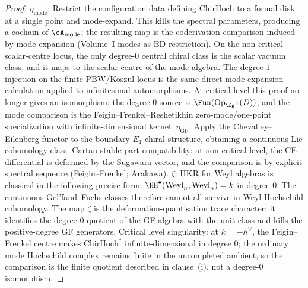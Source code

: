 \begin{proof}
$\eta_{\mathrm{mode}}$: Restrict the configuration data defining
$\mathrm{ChirHoch}$ to a formal disk at a single point and
mode-expand. This kills the spectral parameters, producing a cochain
of $\cA_{\mathrm{mode}}$; the resulting map is the coderivation
comparison induced by mode expansion (Volume~I modes-as-BD
restriction).  On the non-critical scalar-centre locus, the only
degree-$0$ central chiral class is the scalar vacuum class, and it maps
to the scalar centre of the mode algebra.  The degree-$1$ injection on
the finite PBW/Koszul locus is the same direct mode-expansion
calculation applied to infinitesimal automorphisms.  At critical level
this proof no longer gives an isomorphism: the degree-$0$ source is
\(\Fun(\mathrm{Op}_{\fg^\vee}(D))\), and the mode comparison is the
Feigin--Frenkel--Reshetikhin zero-mode/one-point specialization with
infinite-dimensional kernel.
$\eta_{\mathrm{GF}}$: Apply the Chevalley--Eilenberg functor to
the boundary $E_1$-chiral structure, obtaining a continuous Lie
cohomology class. Cartan-stable-part compatibility: at non-critical
level, the CE differential is deformed by the Sugawara vector, and
the comparison is by explicit spectral sequence (Feigin--Frenkel;
Arakawa).
$\zeta$: HKR for Weyl algebras is classical in the following precise
form:
\(\HH^\bullet(\mathrm{Weyl}_n,\mathrm{Weyl}_n)=k\) in degree \(0\).
The continuous Gel'fand--Fuchs classes therefore cannot all survive in
Weyl Hochschild cohomology.  The map \(\zeta\) is the
deformation-quantisation trace character; it identifies the
degree-$0$ quotient of the GF algebra with the unit class and kills the
positive-degree GF generators.  Critical level singularity:
at $k=-h^\vee$, the Feigin--Frenkel centre makes
$\mathrm{ChirHoch}^*$ infinite-dimensional in degree $0$; the ordinary
mode Hochschild complex remains finite in the uncompleted ambient, so
the comparison is the finite quotient described in clause~(i), not a
degree-$0$ isomorphism.
\end{proof}

